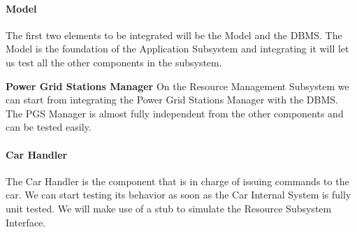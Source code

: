 \documentclass[english]{article}
\begin{document}
\paragraph{Model}
The first two elements to be integrated will be the Model and the DBMS.
The Model is the foundation of the Application Subsystem and integrating it will let us test all the other components in the subsystem.

\begin{figure}[H]
	\centering
\end{figure}

\textbf{Power Grid Stations Manager}
On the Resource Management Subsystem we can start from integrating the Power Grid Stations Manager with the DBMS. 
The PGS Manager is almost fully independent from the other components and can be tested easily.
\begin{figure}[H]
	\centering
\end{figure}

\paragraph{Car Handler}
The Car Handler is the component that is in charge of issuing commands to the car. We can start testing its behavior as soon as the Car Internal System is fully unit tested. We will make use of a stub to simulate the Resource Subsystem Interface.

\begin{figure}[H]
	\centering
\end{figure}
\end{document}
